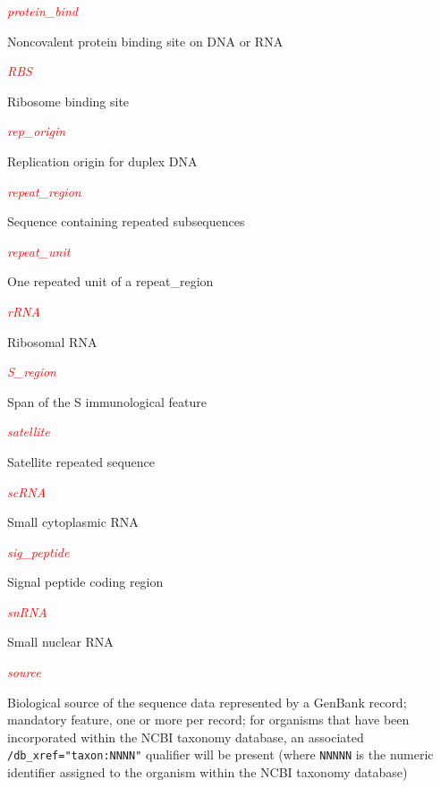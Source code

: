 \textcolor{red}{\textit{protein\_bind}}
\begin{adjustwidth}{1cm}{}
Noncovalent protein binding site on DNA or RNA
\end{adjustwidth}

\textcolor{red}{\textit{RBS}}
\begin{adjustwidth}{1cm}{}
Ribosome binding site
\end{adjustwidth}

\textcolor{red}{\textit{rep\_origin}}
\begin{adjustwidth}{1cm}{}
Replication origin for duplex DNA
\end{adjustwidth}

\textcolor{red}{\textit{repeat\_region}}
\begin{adjustwidth}{1cm}{}
Sequence containing repeated subsequences
\end{adjustwidth}

\textcolor{red}{\textit{repeat\_unit}}
\begin{adjustwidth}{1cm}{}
One repeated unit of a repeat\_region
\end{adjustwidth}

\textcolor{red}{\textit{rRNA}}
\begin{adjustwidth}{1cm}{}
Ribosomal RNA
\end{adjustwidth}

\textcolor{red}{\textit{S\_region}}
\begin{adjustwidth}{1cm}{}
Span of the S immunological feature
\end{adjustwidth}

\textcolor{red}{\textit{satellite}}
\begin{adjustwidth}{1cm}{}
Satellite repeated sequence
\end{adjustwidth}

\textcolor{red}{\textit{scRNA}}
\begin{adjustwidth}{1cm}{}
Small cytoplasmic RNA
\end{adjustwidth}

\textcolor{red}{\textit{sig\_peptide}}
\begin{adjustwidth}{1cm}{}
Signal peptide coding region
\end{adjustwidth}

\textcolor{red}{\textit{snRNA}}
\begin{adjustwidth}{1cm}{}
Small nuclear RNA
\end{adjustwidth}

\textcolor{red}{\textit{source}}
\begin{adjustwidth}{1cm}{}
Biological source of the sequence data represented by a GenBank record; mandatory feature, one or more per record; for organisms that have been incorporated within the NCBI taxonomy database, an associated \verb|/db_xref="taxon:NNNN"| qualifier will be present (where \verb|NNNNN| is the numeric identifier assigned to the organism within the NCBI taxonomy database)
\end{adjustwidth}

